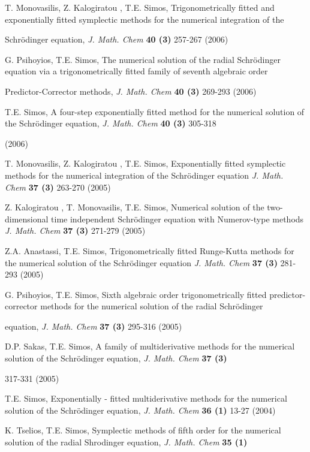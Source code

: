\documentclass[numreferences]{kluwer}
\begin{document}
\begin{article}
\begin{thebibliography}{120}
T. Monovasilis, Z. Kalogiratou , T.E. Simos, Trigonometrically
fitted and exponentially fitted symplectic methods for the
numerical integration of the

Schr\"odinger equation, {\it J. Math. Chem} {\bf 40 (3)} 257-267
(2006)

G. Psihoyios, T.E. Simos, The numerical solution of the radial
Schr\"odinger equation via a trigonometrically fitted family of
seventh algebraic order

Predictor-Corrector methods, {\it J. Math. Chem} {\bf 40 (3)}
269-293 (2006)

T.E. Simos, A four-step exponentially fitted method for the
numerical solution of the Schr\"odinger equation, {\it J. Math.
Chem} {\bf 40 (3)} 305-318

(2006)

T. Monovasilis, Z. Kalogiratou , T.E. Simos, Exponentially fitted
symplectic methods for the numerical integration of the
Schr\"odinger equation {\it J. Math. Chem} {\bf 37 (3)} 263-270
(2005)

Z. Kalogiratou , T. Monovasilis, T.E. Simos, Numerical solution of
the two-dimensional time independent Schr\"odinger equation with
Numerov-type methods {\it J. Math. Chem} {\bf 37 (3)} 271-279
(2005)

Z.A. Anastassi, T.E. Simos, Trigonometrically fitted Runge-Kutta
methods for the numerical solution of the Schr\"odinger equation
{\it J. Math. Chem} {\bf 37 (3)} 281-293 (2005)

G. Psihoyios, T.E. Simos, Sixth algebraic order trigonometrically
fitted predictor-corrector methods for the numerical solution of
the radial Schr\"odinger

equation, {\it J. Math. Chem} {\bf 37 (3)} 295-316 (2005)

D.P. Sakas, T.E. Simos, A family of multiderivative methods for
the numerical solution of the Schr\"odinger equation, {\it J.
Math. Chem} {\bf 37 (3)}

317-331 (2005)

T.E. Simos, Exponentially - fitted multiderivative methods for the
numerical solution of the Schr\"odinger equation, {\it J. Math.
Chem} {\bf 36 (1)} 13-27 (2004)

K. Tselios, T.E. Simos, Symplectic methods of fifth order for the
numerical solution of the radial Shrodinger equation, {\it J.
Math. Chem} {\bf 35 (1)}


\end{thebibliography}
\end{article}
\end{document}

